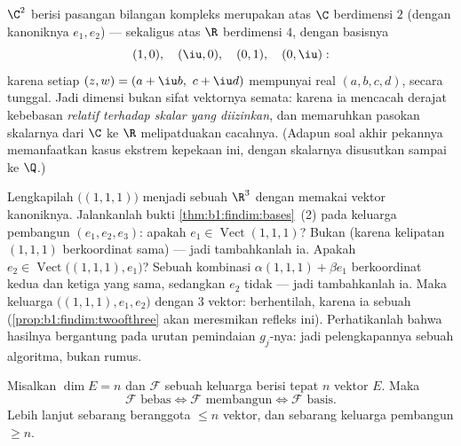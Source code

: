 \begin{example}
\label{ex:b1:findim:twodimensions}
 $\C^2$ berisi pasangan bilangan kompleks merupakan  atas $\C$
berdimensi $2$ (dengan  kanoniknya $e_1, e_2$) --- sekaligus
 atas $\R$ berdimensi $4$, dengan basisnya
\[
(1, 0),\quad (\iu, 0),\quad (0, 1),\quad (0, \iu):
\]
karena setiap $(z, w) = (a + \iu b,\ c + \iu d)$ mempunyai  real
$(a, b, c, d)$, secara tunggal. Jadi dimensi bukan sifat 
vektornya semata: karena ia mencacah derajat kebebasan \emph{relatif
terhadap skalar yang diizinkan}, dan memaruhkan pasokan skalarnya dari $\C$
ke $\R$ melipatduakan cacahnya. (Adapun soal akhir pekannya memanfaatkan
kasus ekstrem kepekaan ini, dengan skalarnya disusutkan sampai
ke $\Q$.)
\end{example}

\begin{example}
\label{ex:b1:findim:completion}
Lengkapilah  $\bigl((1,1,1)\bigr)$ menjadi sebuah 
$\R^3$ dengan memakai vektor kanoniknya. Jalankanlah bukti
\cref{thm:b1:findim:bases}~(2) pada keluarga pembangun $(e_1,
e_2, e_3)$: apakah $e_1 \in \operatorname{Vect}(1,1,1)$? Bukan (karena kelipatan
$(1,1,1)$ berkoordinat sama) --- jadi tambahkanlah ia. Apakah $e_2 \in
\operatorname{Vect}\bigl((1,1,1), e_1\bigr)$? Sebuah kombinasi
$\alpha(1,1,1) + \beta e_1$ berkoordinat kedua dan ketiga yang sama,
sedangkan $e_2$ tidak --- jadi tambahkanlah ia. Maka keluarga
$\bigl((1,1,1), e_1, e_2\bigr)$  dengan $3$ vektor: berhentilah,
karena ia sebuah  (\cref{prop:b1:findim:twoofthree} akan meresmikan
refleks ini). Perhatikanlah bahwa hasilnya bergantung pada urutan
pemindaian $g_j$-nya: jadi pelengkapannya sebuah algoritma, bukan rumus.
\end{example}

\begin{proposition}\label{prop:b1:findim:twoofthree}
Misalkan $\dim E = n$ dan $\mathcal{F}$ sebuah keluarga berisi tepat $n$ vektor
$E$. Maka
\[
\mathcal{F} \text{ bebas} \iff \mathcal{F} \text{ membangun} \iff
\mathcal{F} \text{ basis}.
\]
Lebih lanjut sebarang  beranggota $\leq n$ vektor, dan sebarang keluarga pembangun
$\geq n$.
\end{proposition}

